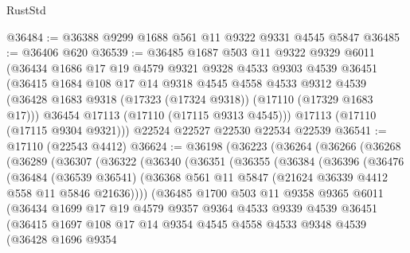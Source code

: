 \begin{lexlean}{RustStd}
\begin{coremodule}
@36484 := @36388 @9299 @1688 @561 @11 @9322 @9331 @4545 @5847
@36485 := @36406 @620
@36539 := @36485
    @1687
    @503
    @11
    @9322
    @9329
    @6011
    (@36434
      @1686
      @17
      @19
      @4579
      @9321
      @9328
      @4533
      @9303
      @4539
      @36451
      (@36415
        @1684
        @108
        @17
        @14
        @9318
        @4545
        @4558
        @4533
        @9312
        @4539
        (@36428 @1683 @9318 (@17323 (@17324 @9318)) (@17110 (@17329 @1683 @17)))
        @36454
        @17113
        (@17110 (@17115 @9313 @4545)))
      @17113
      (@17110 (@17115 @9304 @9321)))
    @22524
    @22527
    @22530
    @22534
    @22539
@36541 := @17110 (@22543 @4412)
@36624 := @36198
    (@36223
      (@36264
        (@36266
          (@36268
            (@36289
              (@36307
                (@36322
                  (@36340
                    (@36351
                      (@36355
                        (@36384
                          (@36396
                            (@36476
                              (@36484
                                (@36539 @36541)
                                (@36368
                                  @561
                                  @11
                                  @5847
                                  (@21624 @36339 @4412 @558 @11 @5846 @21636))))
                            (@36485
                              @1700
                              @503
                              @11
                              @9358
                              @9365
                              @6011
                              (@36434
                                @1699
                                @17
                                @19
                                @4579
                                @9357
                                @9364
                                @4533
                                @9339
                                @4539
                                @36451
                                (@36415
                                  @1697
                                  @108
                                  @17
                                  @14
                                  @9354
                                  @4545
                                  @4558
                                  @4533
                                  @9348
                                  @4539
                                  (@36428
                                    @1696
                                    @9354

\end{coremodule}
\end{lexlean}
